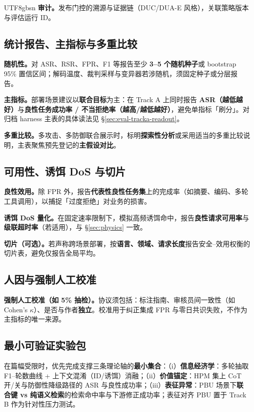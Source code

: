 \documentclass[letterpaper,twocolumn,10pt]{article}
\begin{document}
\begin{CJK}{UTF8}{gbsn}
\textbf{审计。}发布门控的溯源与证据链（DUC/DUA-E 风格），关联策略版本与评估运行 ID。

\subsection{统计报告、主指标与多重比较}
\label{sec:eval-stats}

\textbf{随机性。}对 ASR、RSR、FPR、F1 等报告至少 \textbf{3--5 个随机种子}或 bootstrap 95\% 置信区间；解码温度、裁判采样与变异器若涉随机，须固定种子或分层报告。

\textbf{主指标。}部署场景建议以\textbf{联合目标}为主：在 Track A 上同时报告 \textbf{ASR（越低越好）}与\textbf{良性任务成功率 / 不当拒绝率（越高/越低越好）}，避免单指标「刷分」。对归档 harness 主表的具体读法见 \S\ref{sec:eval-tracka-readout}。

\textbf{多重比较。}多攻击、多防御联合展示时，标明\textbf{探索性分析}或采用适当的多重比较说明，主表聚焦预先登记的\textbf{主假设对比}。

\subsection{可用性、诱饵 DoS 与切片}
\label{sec:eval-utility}

\textbf{良性效用。}除 FPR 外，报告\textbf{代表性良性任务集}上的完成率（如摘要、编码、多轮工具调用），以捕捉「过度拒绝」对业务的损害。

\textbf{诱饵 DoS 量化。}在固定速率限制下，模拟高频诱饵命中，报告\textbf{良性请求可用率}与\textbf{级联超时率}（若适用），与 \S\ref{sec:physics} 一致。

\textbf{切片（可选）。}若声称跨场景部署，按\textbf{语言、领域、请求长度}报告安全--效用权衡的切片表，避免仅报告全局平均。

\subsection{人因与强制人工校准}
\label{sec:eval-human}

\textbf{强制人工校准（如 5\% 抽检）。}协议须包括：标注指南、审核员间一致性（如 Cohen's $\kappa$）、是否与作者\textbf{独立}。校准用于纠正集成 FPR 与零日共识失败，不作为主指标的唯一来源。

\subsection{最小可验证实验包}
\label{sec:eval-minimal}

在篇幅受限时，优先完成支撑三条理论轴的\textbf{最小集合}：（i）\textbf{信息经济学}：多轮抽取 F1--轮数曲线 + 上下文混淆（ID/诱饵）消融；（ii）\textbf{价值锚定}：HPM 集上 CoT 开/关与防御性降级路径的 ASR 与良性成功率；（iii）\textbf{表征异常}：PBU 场景下\textbf{联合键 vs 纯语义检索}的检索命中率与下游修正成功率；表征对齐 PBU 置于 Track B 作为针对性压力测试。


\end{CJK}
\end{document}
